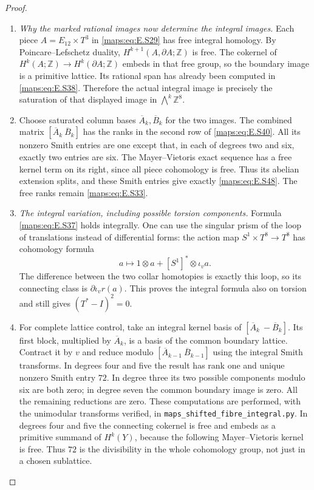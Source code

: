 \begin{proof}
\begin{enumerate}[label=\arabic*.,leftmargin=*]
\item \emph{Why the marked rational images now determine the integral images.}
Each piece $A=E_{12}\times T^3$ in \eqref{maps:eq:E.S29} has free
integral homology. By Poincare--Lefschetz duality,
$H^{k+1}(A,\partial A;\mathbb Z)$ is free. The cokernel
of $H^k(A;\mathbb Z)\to H^k(\partial A;\mathbb Z)$
embeds in that free group, so the boundary image is a
primitive lattice. Its rational span has already been
computed in \eqref{maps:eq:E.S38}. Therefore the actual integral
image is precisely the saturation of that displayed
image in $\bigwedge^k\mathbb Z^8$.

\item Choose saturated column bases $\overline A_k,\overline B_k$
for the two images. The combined matrix
$[\overline A_k\ \overline B_k]$ has the ranks in the
second row of \eqref{maps:eq:E.S40}. All its nonzero Smith entries are
one except that, in each of degrees two and six, exactly
two entries are six. The Mayer--Vietoris exact sequence
has a free kernel term on its right, since all piece
cohomology is free. Thus its abelian extension splits,
and these Smith entries give exactly \eqref{maps:eq:E.S48}. The free
ranks remain \eqref{maps:eq:E.S33}.

\item \emph{The integral variation, including possible torsion components.}
Formula \eqref{maps:eq:E.S37} holds integrally. One can use the singular
prism of the loop of translations instead of differential
forms: the action map $S^1\times T^8\to T^8$ has
cohomology formula
\[
 a\longmapsto 1\otimes a+[S^1]^*\otimes\iota_v a.
\]
The difference between the two collar homotopies is
exactly this loop, so its connecting class is
$\partial\iota_v r(a)$. This proves the integral formula
also on torsion and still gives $(T^*-I)^2=0$.

\item For complete lattice control, take an integral kernel
basis of $[\overline A_k\ -\overline B_k]$. Its first
block, multiplied by $\overline A_k$, is a basis of the
common boundary lattice. Contract it by $v$ and reduce
modulo $[\overline A_{k-1}\ \overline B_{k-1}]$ using
the integral Smith transforms. In degrees four and five
the result has rank one and unique nonzero Smith entry
$72$. In degree three its two possible components
modulo six are both zero; in degree seven the common
boundary image is zero. All the remaining reductions
are zero. These computations are performed, with the
unimodular transforms verified, in
\texttt{maps\_shifted\_fibre\_integral.py}.
In degrees four and five the connecting cokernel is
free and embeds as a primitive summand of $H^k(Y)$,
because the following Mayer--Vietoris kernel is free.
Thus $72$ is the divisibility in the whole cohomology
group, not just in a chosen sublattice.


\end{enumerate}
\end{proof}
